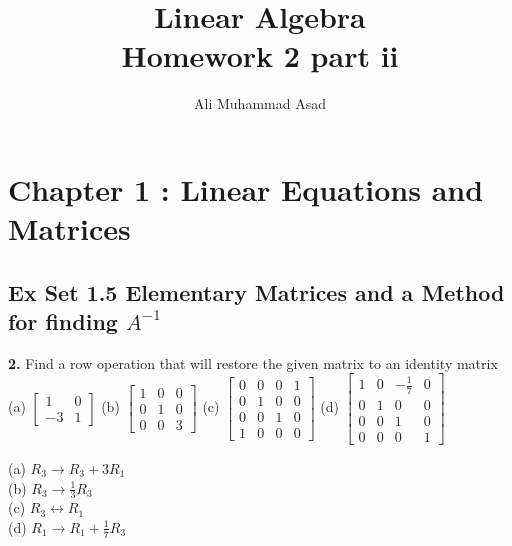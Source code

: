 \documentclass[addpoints]{exam}
\title{Linear Algebra\\ Homework 2 part ii}
\author{Ali Muhammad Asad}
\begin{document}
\maketitle
\section*{\textbf{Chapter 1 : Linear Equations and Matrices}}
\subsection*{\textbf{Ex Set 1.5 Elementary Matrices and a Method for finding $ A^{-1} $}}
\begin{questions}
    \question
    \textbf{2. } Find a row operation that will restore the given matrix to an identity matrix \\
    (a) $ \begin{bmatrix}
        1 & 0 \\ -3 & 1
    \end{bmatrix} $ \hspace{5mm} (b) $ \begin{bmatrix}
        1 & 0 & 0 \\ 0 & 1 & 0 \\ 0 & 0 & 3
    \end{bmatrix} $ \hspace{5mm} (c) $ \begin{bmatrix}
        0 & 0 & 0 & 1 \\ 0 & 1 & 0 & 0 \\ 0 & 0 & 1 & 0 \\ 1 & 0 & 0 & 0
    \end{bmatrix} $ \hspace{5mm} (d) $ \begin{bmatrix}
        1 & 0 & -\frac{1}{7} & 0 \\ 0 & 1 & 0 & 0 \\ 0 & 0 & 1 & 0 \\ 0 & 0 & 0 & 1
    \end{bmatrix} $ 
    \begin{solution}
        
        (a) $ R_3 \longrightarrow R_3 + 3R_1 $ \\ 
        (b) $ R_3 \longrightarrow \frac{1}{3} R_3 $ \\ 
        (c) $ R_3 \longleftrightarrow R_1 $ \\
        (d) $ R_1 \longrightarrow R_1 + \frac{1}{7}R_3 $


\end{solution}
\end{questions}
\end{document}
